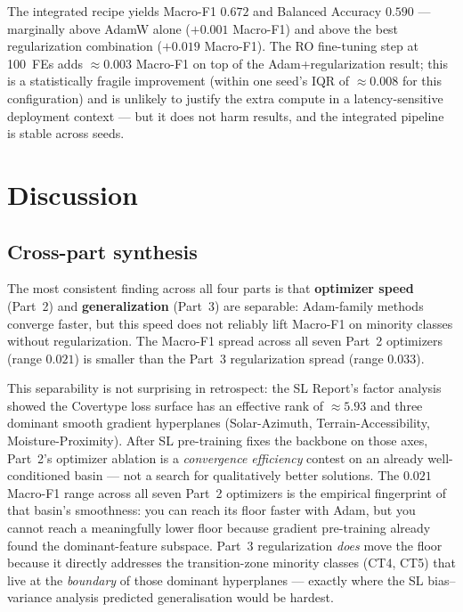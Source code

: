 \documentclass[conference]{IEEEtran}
\begin{document}
The integrated recipe yields Macro-F1 $0.672$ and Balanced Accuracy $0.590$ ---
marginally above AdamW alone ($+0.001$ Macro-F1) and above the best
regularization combination ($+0.019$ Macro-F1).
The RO fine-tuning step at 100~FEs adds ${\approx}0.003$ Macro-F1 on top of
the Adam+regularization result; this is a statistically fragile improvement
(within one seed's IQR of $\approx 0.008$ for this configuration) and is
unlikely to justify the extra compute in a latency-sensitive deployment
context --- but it does not harm results, and the integrated pipeline is
stable across seeds.

\section{Discussion}\label{sec:discuss}

\subsection{Cross-part synthesis}\label{sec:disc:synthesis}
The most consistent finding across all four parts is that
\textbf{optimizer speed} (Part~2) and \textbf{generalization} (Part~3) are
separable: Adam-family methods converge faster, but this speed does not
reliably lift Macro-F1 on minority classes without regularization.
The Macro-F1 spread across all seven Part~2 optimizers (range $0.021$) is
smaller than the Part~3 regularization spread (range $0.033$).

This separability is not surprising in retrospect: the SL Report's factor
analysis showed the Covertype loss surface has an effective rank of
$\approx5.93$ and three dominant smooth gradient hyperplanes
(Solar-Azimuth, Terrain-Accessibility, Moisture-Proximity).
After SL pre-training fixes the backbone on those axes, Part~2's optimizer
ablation is a \emph{convergence efficiency} contest on an already
well-conditioned basin --- not a search for qualitatively better solutions.
The $0.021$ Macro-F1 range across all seven Part~2 optimizers is
the empirical fingerprint of that basin's smoothness: you can reach its
floor faster with Adam, but you cannot reach a meaningfully lower floor
because gradient pre-training already found the dominant-feature subspace.
Part~3 regularization \emph{does} move the floor because it directly
addresses the transition-zone minority classes (CT4, CT5) that live at the
\emph{boundary} of those dominant hyperplanes --- exactly where the SL
bias--variance analysis predicted generalisation would be hardest.
\end{document}
